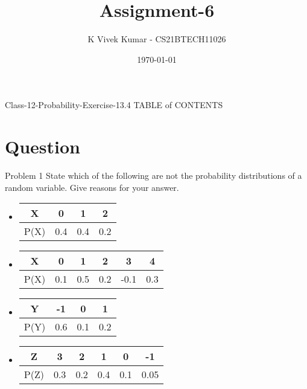 \documentclass{beamer}
\title{Assignment-6}
\author{K Vivek Kumar - CS21BTECH11026}
\date{\today}
\begin{document}
\begin{frame}
    \titlepage 
\end{frame}

\logo{}


\begin{frame}{Class-12-Probability-Exercise-13.4}
TABLE of CONTENTS
    \tableofcontents
\end{frame}


\section{Question}
\begin{frame}{Problem 1}
State which of the following are not the probability distributions of a random variable. Give reasons for your answer.
\begin{itemize}
    \item
    \begin{tabular}{|c|c|c|c|}
\hline
    X & 0 & 1 & 2 \\ 
\hline
    P(X) & 0.4 & 0.4 & 0.2\\ 
\hline
\end{tabular}

    \item \begin{tabular}{|c|c|c|c|c|c|}
\hline
    X & 0 & 1 & 2 & 3 & 4 \\ 
\hline
    P(X) & 0.1 & 0.5 & 0.2 & -0.1 & 0.3\\ 
\hline
\end{tabular}
\item \begin{tabular}{|c|c|c|c|}
\hline
    Y & -1 & 0 & 1 \\ 
\hline
    P(Y) & 0.6 & 0.1 & 0.2\\ 
\hline
\end{tabular}
\item \begin{tabular}{|c|c|c|c|c|c|}
\hline
    Z & 3 & 2 & 1 & 0 & -1 \\ 
\hline
    P(Z) & 0.3 & 0.2 & 0.4 & 0.1 & 0.05\\ 
\hline
\end{tabular}
    \end{itemize}
\end{frame}


\end{document}

